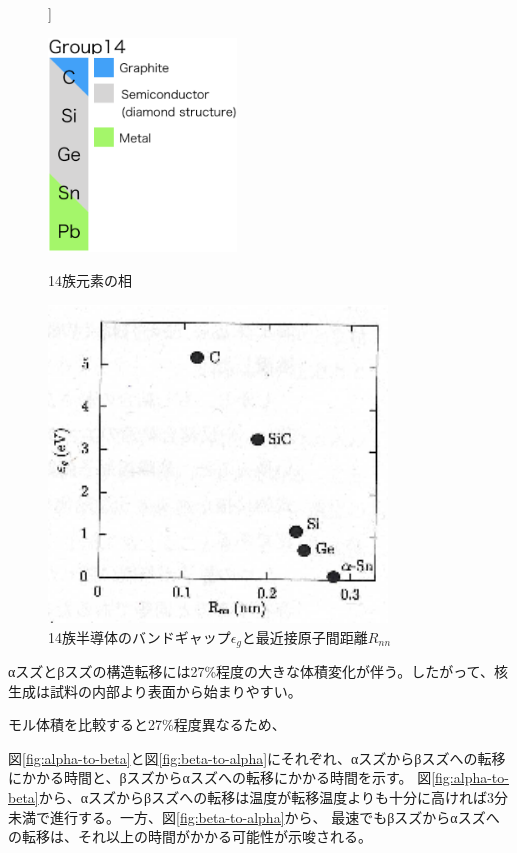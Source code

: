 \begin{figure}[htb]]
 \begin{minipage}{0.4\hsize}
  \begin{center}
   \includegraphics[width=50mm]{Introduction/group14.eps}
  \end{center}
  \caption{14族元素の相}
  \label{fig:group14}
 \end{minipage}
 \begin{minipage}{0.6\hsize}
  \begin{center}
   \includegraphics[width=90mm]{Introduction/bandgaps.eps}
  \end{center}
  \caption{14族半導体のバンドギャップ$\epsilon_g$と最近接原子間距離$R_{nn}$\cite{Yonezawa}}
  \label{fig:bandgaps}
 \end{minipage}
\end{figure}

αスズとβスズの構造転移には27\%程度の大きな体積変化が伴う。したがって、核生成は試料の内部より表面から始まりやすい\cite{Cornelius}。

モル体積を比較すると27\%程度異なるため、

図\ref{fig:alpha-to-beta}と図\ref{fig:beta-to-alpha}にそれぞれ、αスズからβスズへの転移にかかる時間と、βスズからαスズへの転移にかかる時間を示す\cite{Nogita}。
図\ref{fig:alpha-to-beta}から、αスズからβスズへの転移は温度が転移温度よりも十分に高ければ3分未満で進行する。一方、図\ref{fig:beta-to-alpha}から、
最速でもβスズからαスズへの転移は、それ以上の時間がかかる可能性が示唆される。

